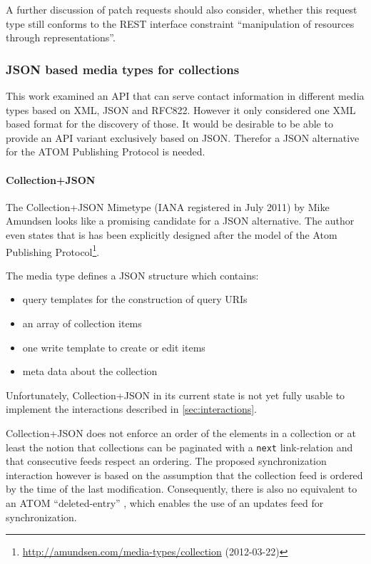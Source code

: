 \documentclass[11pt,a4paper,headsepline,twoside]{scrartcl}		%
\newcommand{\citeurl}[2]{\url{#1} (#2)}
\begin{document}
A further discussion of patch requests should also consider, whether this
request type still conforms to the REST interface constraint ``manipulation of
resources through representations''\cite[sec. 5.1.5]{Fielding2000}.

\subsubsection{JSON based media types for collections}
\label{sec:media-types-coll}

This work examined an API that can serve contact information in different
media types based on XML, JSON and RFC822. However it only considered one XML
based format for the discovery of those. It would be desirable to be able to
provide an API variant exclusively based on JSON. Therefor a JSON alternative
for the ATOM Publishing Protocol is needed.

\paragraph{Collection+JSON}
\label{sec:collection+json}

The Collection+JSON Mimetype (IANA registered in July 2011) by Mike
Amundsen \cite{Amundsen2011a}\cite[ch. 3]{amundsen2011building} looks like a
promising candidate for a JSON alternative. The author even states that is has
been explicitly designed after the model of the Atom Publishing
Protocol\footnote{\citeurl{http://amundsen.com/media-types/collection}{2012-03-22}}.

The media type defines a JSON structure which contains:

\begin{itemize}
\item query templates for the construction of query URIs
\item an array of collection items
\item one write template to create or edit items
\item meta data about the collection
\end{itemize}

Unfortunately, Collection+JSON in its current state is not yet fully usable to
implement the interactions described in \ref{sec:interactions}.

Collection+JSON does not enforce an order of the elements in a collection or at
least the notion that collections can be paginated with a \lstinline:next:
link-relation and that consecutive feeds respect an ordering. The proposed
synchronization interaction however is based on the assumption that the
collection feed is ordered by the time of the last modification. Consequently,
there is also no equivalent to an ATOM ``deleted-entry''
\cite{draft-snell-atompub-tombstones-14}, which enables the use of an updates
feed for synchronization.
\end{document}
